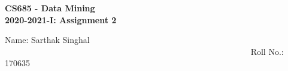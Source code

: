 \documentclass[20pt]{letter}
\begin{document}
\begin{center}
{\LARGE \textbf{
CS685 - Data Mining\\
2020-2021-I: Assignment 2
}}\end{center}

{\Large
Name: Sarthak Singhal        ~~~~~~~~~~~~~~~~~~~~~~~~~~~~~~~~~~~~~~~~~~~~~~~~~~~~~~~~~~   Roll No.: 170635\\\\}



\end{document}
